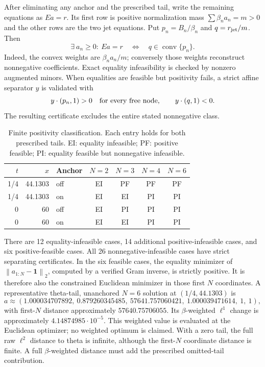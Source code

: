 \documentclass[11pt]{article}
\theoremstyle{remark}\newtheorem{remark}[theorem]{Remark}
\newcommand{\norm}[1]{\left\lVert #1\right\rVert}
\DeclareMathOperator{\conv}{conv}
\begin{document}
After eliminating any anchor and the prescribed tail, write the remaining equations as $Ea=r$. Its first row is positive normalization mass $\sum\beta_na_n=m>0$ and the other rows are the two jet equations. Put $p_n=B_n/\beta_n$ and $q=r_{\rm jet}/m$. Then
\begin{equation}\label{eq:convex}
 \exists\ a_n\ge0:\ Ea=r\quad\Longleftrightarrow\quad
 q\in\conv\{p_n\}.
\end{equation}
Indeed, the convex weights are $\beta_na_n/m$; conversely those weights reconstruct nonnegative coefficients. Exact equality infeasibility is checked by nonzero augmented minors. When equalities are feasible but positivity fails, a strict affine separator $y$ is validated with
\[
 y\cdot(p_n,1)>0\quad\hbox{for every free node},\qquad
 y\cdot(q,1)<0.
\]
The resulting certificate excludes the entire stated nonnegative class.

\begin{table}[htbp]
\centering
\caption{Finite positivity classification. Each entry holds for both prescribed tails. EI: equality infeasible; PF: positive feasible; PI: equality feasible but nonnegative infeasible.}\label{tab:positive}
\begin{tabular}{@{}rrlcccc@{}}
\toprule
$t$&$x$&Anchor&$N=2$&$N=3$&$N=4$&$N=6$\\\midrule
1/4&44.1303&off&EI&PF&PF&PF\\
1/4&44.1303&on &EI&EI&PI&PI\\
0&60&off&EI&PI&PI&PI\\
0&60&on &EI&EI&PI&PI\\\bottomrule
\end{tabular}
\end{table}
There are 12 equality-infeasible cases, 14 additional positive-infeasible cases, and six positive-feasible cases. All 26 nonnegative-infeasible cases have strict separating certificates. In the six feasible cases, the equality minimizer of $\norm{a_{1:N}-\mathbf1}_2$, computed by a verified Gram inverse, is strictly positive. It is therefore also the constrained Euclidean minimizer in those first $N$ coordinates. A representative theta-tail, unanchored $N=6$ solution at $(1/4,44.1303)$ is
\[
 a\approx(1.000034707892,\ 0.879260345485,\ 57641.757060421,\
 1.000039471614,\ 1,\ 1),
\]
with first-$N$ distance approximately $57640.75706055$. Its $\beta$-weighted $\ell^1$ change is approximately $4.14874985\cdot10^{-5}$. This weighted value is evaluated at the Euclidean optimizer; no weighted optimum is claimed. With a zero tail, the full raw $\ell^2$ distance to theta is infinite, although the first-$N$ coordinate distance is finite. A full $\beta$-weighted distance must add the prescribed omitted-tail contribution.
\end{document}
